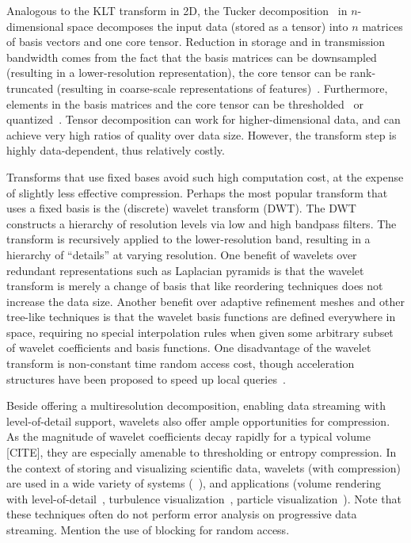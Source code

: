 Analogous to the KLT transform in 2D, the Tucker decomposition~\cite{tensor_dvr2015} in
$n$-dimensional space decomposes the input data (stored as a tensor) into $n$ matrices of basis
vectors and one core tensor. Reduction in storage and in transmission bandwidth comes from the fact
that the basis matrices can be downsampled (resulting in a lower-resolution representation), the
core tensor can be rank-truncated (resulting in coarse-scale representations of
features)~\cite{tamresh,tucker-thresholding,multiscale-tensor}. Furthermore, elements in the basis
matrices and the core tensor can be thresholded~\cite{tucker-thresholding} or
quantized~\cite{tamresh,multiscale-tensor}. Tensor decomposition can work for higher-dimensional
data, and can achieve very high ratios of quality over data size. However, the transform step is
highly data-dependent, thus relatively costly.

Transforms that use fixed bases avoid such high computation cost, at the expense of slightly less
effective compression. Perhaps the most popular transform that uses a fixed basis is the (discrete)
wavelet transform (DWT). The DWT constructs a hierarchy of resolution levels via low and high
bandpass filters. The transform is recursively applied to the lower-resolution band, resulting in a
hierarchy of ``details'' at varying resolution. One benefit of wavelets over redundant
representations such as Laplacian pyramids is that the wavelet transform is merely a change of basis
that like reordering techniques does not increase the data size. Another benefit over adaptive
refinement meshes and other tree-like techniques is that the wavelet basis functions are defined
everywhere in space, requiring no special interpolation rules when given some arbitrary subset of
wavelet coefficients and basis functions. One disadvantage of the wavelet transform is non-constant
time random access cost, though acceleration structures have been proposed to speed up local
queries~\cite{weiss}.

Beside offering a multiresolution decomposition, enabling data streaming with level-of-detail
support, wavelets also offer ample opportunities for compression. As the magnitude of wavelet
coefficients decay rapidly for a typical volume [CITE], they are especially amenable to thresholding
or entropy compression. In the context of storing and visualizing scientific data, wavelets (with
compression) are used in a wide variety of systems
(~\cite{multires_toolkit2003,vapor2007,woodring2011}), and applications (volume rendering with
level-of-detail~\cite{wavelet-compression-interactive-vis,multires-framework,rapid-compression-volume,interactive-rendering-large-volume,multires-volume-rendering},
turbulence visualization~\cite{treib}, particle visualization~\cite{sph-octree}). Note that these
techniques often do not perform error analysis on progressive data streaming. Mention the use of
blocking for random access.

